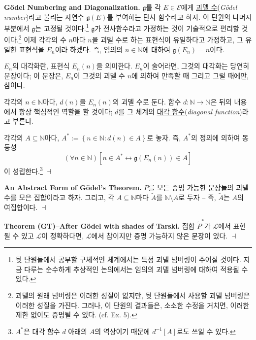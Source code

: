 \documentclass[12pt]{paper}
\newcommand{\gnum}{ \mathfrak{g} }
\newenvironment{context}[1][]{\noindent \textbf{{#1}.}}{\hfill $ \dashv $}
\begin{document}
  \begin{context}[G\"odel Numbering and Diagonalization]
    $\gnum$를 각 $E \in \mathcal{E}$에게 \underline{괴델 수}(\textit{G\"odel number})라고 불리는 자연수 $\gnum \left( E \right)$를 부여하는 단사 함수라고 하자.
    이 단원의 나머지 부분에서 $\gnum$는 고정될 것이다.\footnote
    {
      뒷 단원들에서 공부할 구체적인 체계에서는 특정 괴델 넘버링이 주어질 것이다.
      지금 다루는 순수하게 추상적인 논의에서는 임의의 괴델 넘버링에 대하여 적용될 수 있다.
    }
    $\gnum$가 전사함수라고 가정하는 것이 기술적으로 편리할 것이다.\footnote
    {
      괴델의 원래 넘버링은 이러한 성질이 없지만,
      뒷 단원들에서 사용할 괴델 넘버링은 이러한 성질을 가진다.
      그러나, 이 단원의 결과들은, 소소한 수정을 거치면,
      이러한 제한 없이도 증명될 수 있다.
      (cf. Ex. 5).
    }
    이제 각각의 수 $n$마다 $n$을 괴델 수로 하는 표현식이 유일하다고 가정하고,
    그 유일한 표현식을 $E_{n}$이라 하겠다.
    즉, 임의의 $n \in \mathbb{N}$에 대하여 $\gnum \left( E_{n} \right) = n$이다.

    $E_{n}$의 대각화란, 표현식 $E_{n} \left( n \right)$을 의미한다.
    $E_{n}$이 술어라면, 그것의 대각화는 당연히 문장이다;
    이 문장은, $E_{n}$이 그것의 괴델 수 $n$에 의하여 만족할 때 그리고 그럴 때에만, 참이다.

    각각의 $n \in \mathbb{N}$마다, $d \left( n \right)$을 $E_{n} \left( n \right)$의 괴델 수로 둔다.
    함수 $d : \mathbb{N} \to \mathbb{N}$은 뒤의 내용에서 항상 핵심적인 역할을 할 것이다;
    $d$를 그 체계의 \underline{대각 함수}(\textit{diagonal function})라고 부른다.

    각각의 $A \subseteq \mathbb{N}$마다, $A^{*} := \left\{ n \in \mathbb{N} : d \left( n \right) \in A \right\} $로 놓자.
    즉, $A^{*}$의 정의에 의하여 동등성 $$ \left( \forall n \in \mathbb{N} \right) \left[ n \in A^{*} \leftrightarrow \gnum \left( E_{n} \left( n \right) \right) \in A \right] $$이 성립한다.\footnote
    {
      $A^{*}$은 대각 함수 $d$ 아래의 $A$의 역상이기 때문에 $d^{-1} \left[ A \right]$로도 쓰일 수 있다.
    }
  \end{context}

  \begin{context}[An Abstract Form of G\"odel's Theorem]
    $P$를 모든 증명 가능한 문장들의 괴델 수를 모은 집합이라고 하자.
    그리고, 각 $A \subseteq \mathbb{N}$마다 $\tilde{A}$를 $\mathbb{N} \setminus A$로 두자 --
    즉, $\tilde{A}$는 $A$의 여집합이다.
  \end{context}

  \begin{context}[Theorem (GT)--After G\"odel with shades of Tarski]
    집합 $\tilde{P}^{*}$가 $\mathcal{L}$에서 표현될 수 있고 $\mathcal{L}$이 정확하다면,
    $\mathcal{L}$에서 참이지만 증명 가능하지 않은 문장이 있다.
  \end{context}
\end{document}
